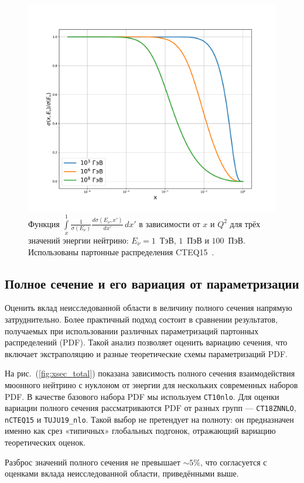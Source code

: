 \begin{figure}[!h]
\centering
\includegraphics[width=0.8\linewidth]{images/NuProp/cdfxy_plot_CT18ZNNLO_14.pdf}
\caption{Функция 
$\int\limits_{x}^1 \frac{1}{\sigma(E_\nu)}\frac{d\sigma(E_\nu,x')}{dx'}\,dx'$ 
в зависимости от $x$ и $Q^2$ для трёх значений энергии нейтрино: 
$E_{\nu} = 1$~ТэВ, $1$~ПэВ и $100$~ПэВ. 
Использованы партонные распределения CTEQ15~\cite{ncteq15}.}
\label{fig:CDF_x}
\end{figure}


\subsection{Полное сечение и его вариация от параметризации}

Оценить вклад неисследованной области в величину полного сечения напрямую затруднительно. 
Более практичный подход состоит в сравнении результатов, получаемых при использовании различных параметризаций партонных распределений (PDF). 
Такой анализ позволяет оценить вариацию сечения, что включает экстраполяцию и разные теоретические схемы параметризаций PDF.

На рис.~(\ref{fig:xsec_total}) показана зависимость полного сечения взаимодействия мюонного нейтрино с нуклоном от энергии для нескольких современных наборов PDF. 
В  качестве базового набора PDF мы используем \texttt{CT10nlo}. 
Для оценки вариации полного сечения рассматриваются PDF от разных групп — \texttt{CT18ZNNLO}, \texttt{nCTEQ15} и \texttt{TUJU19\_nlo}. 
Такой выбор не претендует на полноту: он предназначен именно как срез «типичных» глобальных подгонок, отражающий вариацию теоретических оценок. 

Разброс значений полного сечения не превышает $\sim5\%$, что согласуется с оценками вклада неисследованной области, приведёнными выше.

